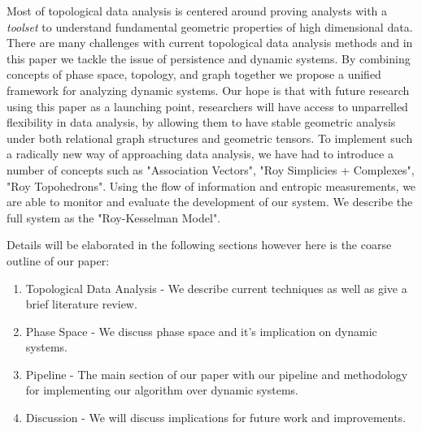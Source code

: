 Most of topological data analysis is centered around proving analysts with a \textit{toolset} to understand fundamental geometric properties of high dimensional data. There are many challenges with current topological data analysis methods and in this paper we tackle the issue of persistence and dynamic systems. By combining concepts of phase space, topology, and graph together we propose a unified framework for analyzing dynamic systems. Our hope is that with future research using this paper as a launching point, researchers will have access to unparrelled flexibility in data analysis, by allowing them to have stable geometric analysis under both relational graph structures and geometric tensors. To implement such a radically new way of approaching data analysis, we have had to introduce a number of concepts such as "Association Vectors", "Roy Simplicies + Complexes", "Roy Topohedrons". Using the flow of information and entropic measurements, we are able to monitor and evaluate the development of our system. We describe the full system as the "Roy-Kesselman Model". 

Details will be elaborated in the following sections however here is the coarse outline of our paper:

\begin{enumerate}
\item Topological Data Analysis - We describe current techniques as well as give a brief literature review.
\item Phase Space - We discuss phase space and it's implication on dynamic systems.
\item Pipeline - The main section of our paper with our pipeline and methodology for implementing our algorithm over dynamic systems.
\item Discussion - We will discuss implications for future work and improvements. 
\end{enumerate}
